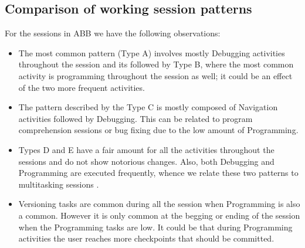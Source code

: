 \documentclass[conference]{IEEEtran}
\begin{document}
\subsection{Comparison of working session patterns}
For the sessions in ABB we have the following observations:
\begin{itemize}
	\item The most common pattern (Type A) involves mostly Debugging activities throughout the session and its followed by Type B, where the most common activity is programming throughout the session as well; it could be an effect of the two more frequent activities.
	
	\item The pattern described by the Type C is mostly composed of Navigation activities followed by Debugging. This can be related to program comprehension sessions \cite{MMLK14} or bug fixing due to the low amount of Programming.
	
	\item Types D and E have a fair amount for all the activities throughout the sessions and do not show notorious changes. Also, both Debugging and Programming are executed frequently, whence we relate these two patterns to multitasking sessions \cite{SLV10}.
	
	\item Versioning tasks are common during all the session when Programming is also a common. However it is only common at the begging or ending of the session when the Programming tasks are low. It could be that during Programming activities the user reaches more checkpoints that should be committed. 
\end{itemize}
\end{document}
